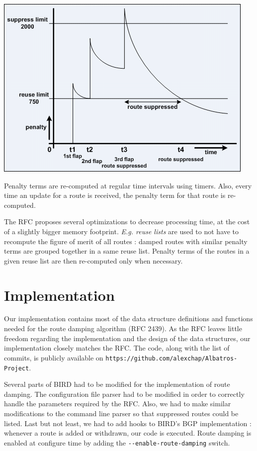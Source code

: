 \documentclass[a4paper,english]{IEEEtran}
\begin{document}
\begin{center}
\includegraphics[scale=0.5]{route_damping} 
\par\end{center}

Penalty terms are re-computed at regular time intervals using timers.
Also, every time an update for a route is received, the penalty term
for that route is re-computed.

The RFC proposes several optimizations to decrease processing time,
at the cost of a slightly bigger memory footprint. \textit{E.g. reuse
lists} are used to not have to recompute the figure of merit of all
routes : damped routes with similar penalty terms are grouped together
in a same reuse list. Penalty terms of the routes in a given reuse
list are then re-computed only when necessary.


\section{Implementation}

Our implementation contains most of the data structure definitions
and functions needed for the route damping algorithm (RFC 2439).
As the RFC leaves little freedom regarding the implementation and the 
design of the data structures, our implementation closely matches the RFC.
The code, along with the list of commits, is publicly available on
{\tt\small https://github.com/alexchap/Albatros-Project}.

Several parts of BIRD had to be modified for the implementation of route damping.
The configuration file parser had to be modified in order to correctly handle the parameters
required by the RFC.
Also, we had to make similar modifications to the command line parser so that suppressed routes
could be listed.
Last but not least, we had to add hooks to BIRD's BGP implementation : whenever a route is added or withdrawn, our code is executed.
Route damping is enabled at configure time by adding the {\tt\small -{}-enable-route-damping}
switch.
\end{document}
